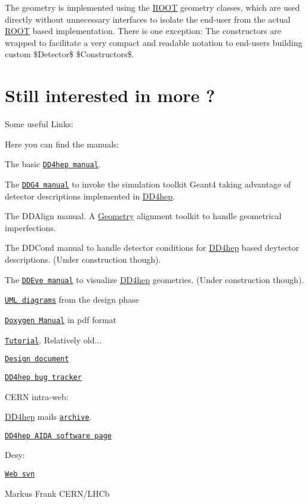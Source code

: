 The geometry is implemented using the \hyperlink{namespace_r_o_o_t}{ROOT} geometry classes, which are used directly without unnecessary interfaces to isolate the end-\/user from the actual \hyperlink{namespace_r_o_o_t}{ROOT} based implementation. There is one exception: The constructors are wrapped to facilitate a very compact and readable notation to end-\/users building custom \$Detector\$ \$Constructors\$.\hypertarget{index_MORE_INFO}{}\section{Still interested in more ?}\label{index_MORE_INFO}
\label{_UsefulLinks}
Some useful Links:

Here you can find the manuals:


\begin{DoxyItemize}
\item The basic \href{../DD4hepManual.pdf}{\tt DD4hep manual}.
\item The \href{../DDG4Manual.pdf}{\tt DDG4 manual} to invoke the simulation toolkit Geant4 taking advantage of detector descriptions implemented in \hyperlink{namespace_d_d4hep}{DD4hep}.
\item The DDAlign manual. A \hyperlink{namespace_geometry}{Geometry} alignment toolkit to handle geometrical imperfections.
\item The DDCond manual to handle detector conditions for \hyperlink{namespace_d_d4hep}{DD4hep} based deytector descriptions. (Under construction though).
\item The \href{../DDEveManual.pdf}{\tt DDEve manual} to visualize \hyperlink{namespace_d_d4hep}{DD4hep} geometries. (Under construction though).
\item \href{../DD4hep_Diagrams.pdf}{\tt UML diagrams} from the design phase
\item \href{../refman.pdf}{\tt Doxygen Manual} in pdf format
\item \href{../DD4hep_Tutorial.pdf}{\tt Tutorial}. Relatively old...
\item \href{http://cds.cern.ch/record/1473120/files/AIDA-D2_3.pdf}{\tt Design document}
\item \href{https://sft.its.cern.ch/jira/browse/DDFORHEP}{\tt DD4hep bug tracker}
\end{DoxyItemize}CERN intra-\/web:
\begin{DoxyItemize}
\item \hyperlink{namespace_d_d4hep}{DD4hep} mails \href{https://groups.cern.ch/group/dd4hep-developers/Lists/Archive/100.aspx}{\tt archive}.
\item \href{http://aidasoft.web.cern.ch/DD4hep}{\tt DD4hep AIDA software page}
\end{DoxyItemize}Desy:
\begin{DoxyItemize}
\item \href{https://svnsrv.desy.de/websvn/wsvn/General.aidasoft/DD4hep}{\tt Web svn}
\end{DoxyItemize}Markus Frank CERN/LHCb 
